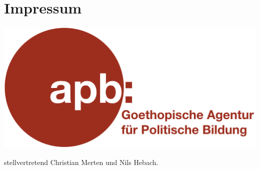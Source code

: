 \documentclass{sasbase}
\begin{document}
\section{Impressum}
\begin{minipage}{0.4\linewidth}
\includegraphics[width=\textwidth]{apb_icon.png}
\end{minipage}
\begin{minipage}{0.5\linewidth}
stellvertretend Christian Merten und Nils Hebach.
\end{minipage}
\end{document}
